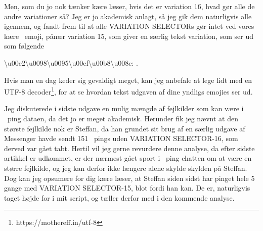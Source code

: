 \begin{article}
Men, som du jo nok tænker kære læser, hvis det er variation 16, hvad gør alle de andre variationer så? Jeg er jo akademisk anlagt, så jeg gik dem naturligvis alle igennem, og fandt frem til at alle VARIATION SELECTORs gør intet ved vores kære \coffee\ emoji, pånær variation 15, som giver en særlig tekst variation, som ser ud som følgende
\begin{center}
	\textbackslash u00e2\textbackslash u0098\textbackslash u0095\textbackslash u00ef\textbackslash u00b8\textbackslash u008e: \textcoffee \; .
\end{center}
Hvis man en dag keder sig gevaldigt meget, kan jeg anbefale at lege lidt med en UTF-8 decoder\footnote{https://mothereff.in/utf-8}, for at se hvordan tekst udgaven af dine yndligs emojies ser ud.

Jeg diskuterede i sidste udgave en mulig mængde af fejlkilder som kan være i \coffee\ ping dataen, da det jo er meget akademisk. Herunder fik jeg nævnt at den største fejlkilde nok er Steffan, da han grundet sit brug af en særlig udgave af Messenger havde sendt 151 \coffee\ pings uden VARIATION SELECTOR-16, som derved var gået tabt.
Hertil vil jeg gerne revurdere denne analyse, da efter sidste artikkel er udkommet, er der nærmest gået sport i \coffee\ ping chatten om at være en større fejlkilde, og jeg kan derfor ikke længere alene skylde skylden på Steffan.
Dog kan jeg opsumere for dig kære læser, at Steffan siden sidst har pinget hele 5 gange med VARIATION SELECTOR-15, blot fordi han kan. De er, naturligvis taget højde for i mit script, og tæller derfor med i den kommende analyse.


\end{article}
